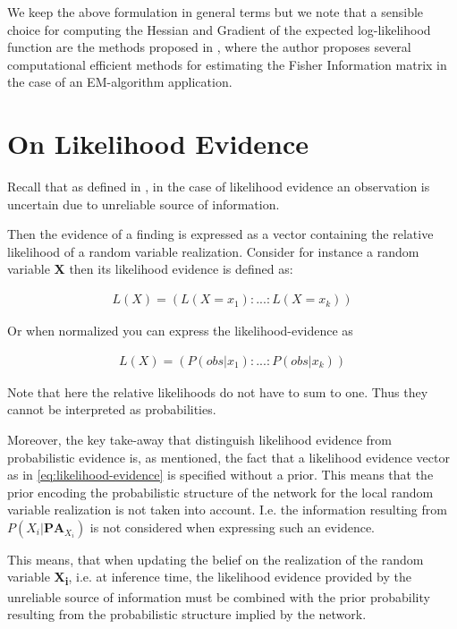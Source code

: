 \documentclass[11pt]{article}
\begin{document}
\begin{article}
We keep the above formulation in general terms but we note that a
sensible choice for computing the Hessian and Gradient of the
expected log-likelihood function are the methods proposed in
\cite{meng2016method}, where the author proposes several
computational efficient methods for estimating the Fisher
Information matrix in the case of an EM-algorithm application. 

\newpage

\section{On Likelihood Evidence}
\label{likelihood-em}
Recall that as defined in \cite{Mrad_2015}, in the case of
likelihood evidence an observation is uncertain due to unreliable
source of information.

Then the evidence of a finding is expressed as a vector containing
the relative likelihood of a random variable realization. Consider
for instance a random variable \textbf{X} then its likelihood evidence is
defined as:

\begin{align} \label{eq:likelihood-evidence}
 L(X) = (L(X = x_1): ... : L(X = x_k))
\end{align}

Or when normalized you can express the likelihood-evidence as 

\begin{align} \label{eq:normalized-likelihood-evidence}
 L(X) = (P(obs | x_1): ... : P(obs | x_k))
\end{align}

Note that here the relative likelihoods do not have to sum to
one. Thus they cannot be interpreted as probabilities.

Moreover, the key take-away that distinguish likelihood evidence
from probabilistic evidence is, as mentioned, the fact that a
likelihood evidence vector as in \ref{eq:likelihood-evidence} is
specified without a prior. This means that the prior encoding the
probabilistic structure of the network for the local random
variable realization is not taken into account. I.e. the
information resulting from \(P(X_i|\textbf{PA}_{X_i})\) is not considered when
expressing such an evidence.

This means, that when updating the belief on the realization of
the random variable \textbf{X\textsubscript{i}}, i.e. at inference time, the likelihood
evidence provided by the unreliable source of information must be
combined with the prior probability resulting from the
probabilistic structure implied by the network.


\end{article}
\end{document}
